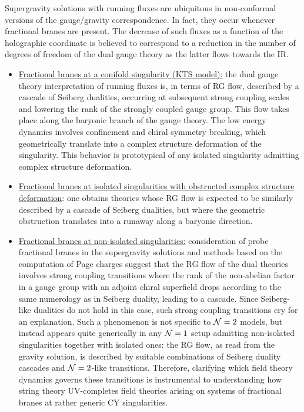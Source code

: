 Supergravity solutions with running fluxes are ubiquitous in non-conformal versions of the gauge/gravity correspondence. In fact, they occur whenever fractional branes are present. The decrease of such fluxes as a function of the holographic coordinate is believed to correspond to a reduction in the number of degrees of freedom of the dual gauge theory as the latter flows towards the IR.
\begin{itemize}
    \item \underline{Fractional branes at a conifold singularity (KTS model):} the dual gauge theory interpretation of running fluxes is, in terms of RG flow, described by a cascade of Seiberg dualities, occurring at subsequent strong coupling scales and lowering the rank of the strongly coupled gauge group. This flow takes place along the baryonic branch of the gauge theory. The low energy dynamics involves confinement and chiral symmetry breaking, which geometrically translate into a complex structure deformation of the singularity. This behavior is prototypical of any isolated singularity admitting complex structure deformation.
    \item \underline{Fractional branes at isolated singularities with obstructed complex structure deformation}: one obtains theories whose RG flow is expected to be similarly described by a cascade of Seiberg dualities, but where the geometric obstruction translates into a runaway along a baryonic direction.
    \item \underline{Fractional branes at non-isolated singularities:} consideration of probe fractional branes in the supergravity solutions and methods based on the computation of Page charges suggest that the RG flow of the dual theories involves strong coupling transitions where the rank of the non-abelian factor in a gauge group with an adjoint chiral superfield drops according to the same numerology as in Seiberg duality, leading to a cascade. Since Seiberg-like dualities do not hold in this case, such strong coupling transitions cry for an explanation. Such a phenomenon is not specific to $\mathcal{N} = 2$ models, but instead appears quite generically in any $\mathcal{N} = 1$ setup admitting non-isolated singularities together with isolated ones: the RG flow, as read from the gravity solution, is described by suitable combinations of Seiberg duality cascades and $\mathcal{N} = 2$-like transitions. Therefore, clarifying which field theory dynamics governs these transitions is instrumental to understanding how string theory UV-completes field theories arising on systems of fractional branes at rather generic CY singularities.
\end{itemize}

